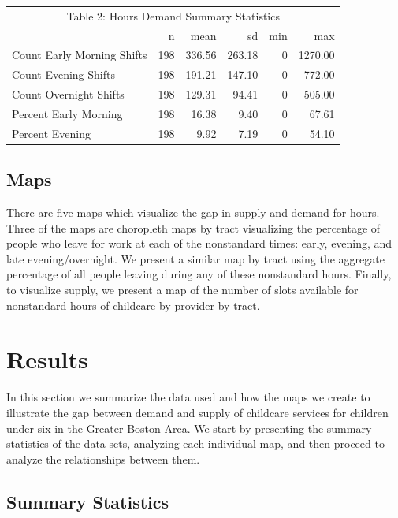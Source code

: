 \documentclass[10pt,letterpaper]{article}
\begin{document}
\begin{table}[!h]
\centering\begingroup\fontsize{10}{12}\selectfont

\begin{tabular}{l|r|r|r|r|r}
\hline
\multicolumn{6}{c|}{Table 2: Hours Demand Summary Statistics} \\
\cline{1-6}
  & n & mean & sd & min & max\\
\hline
\rowcolor{gray!6}  Count Early Morning Shifts & 198 & 336.56 & 263.18 & 0 & 1270.00\\
\hline
Count Evening Shifts & 198 & 191.21 & 147.10 & 0 & 772.00\\
\hline
\rowcolor{gray!6}  Count Overnight Shifts & 198 & 129.31 & 94.41 & 0 & 505.00\\
\hline
Percent Early Morning & 198 & 16.38 & 9.40 & 0 & 67.61\\
\hline
\rowcolor{gray!6}  Percent Evening & 198 & 9.92 & 7.19 & 0 & 54.10\\
\hline
\end{tabular}
\endgroup{}
\end{table}

\subsection{Maps}\label{maps-1}

There are five maps which visualize the gap in supply and demand for
hours. Three of the maps are choropleth maps by tract visualizing the
percentage of people who leave for work at each of the nonstandard
times: early, evening, and late evening/overnight. We present a similar
map by tract using the aggregate percentage of all people leaving during
any of these nonstandard hours. Finally, to visualize supply, we present
a map of the number of slots available for nonstandard hours of
childcare by provider by tract.

\section{Results}\label{results}

In this section we summarize the data used and how the maps we create to
illustrate the gap between demand and supply of childcare services for
children under six in the Greater Boston Area. We start by presenting
the summary statistics of the data sets, analyzing each individual map,
and then proceed to analyze the relationships between them.

\subsection{Summary Statistics}\label{summary-statistics}
\end{document}
